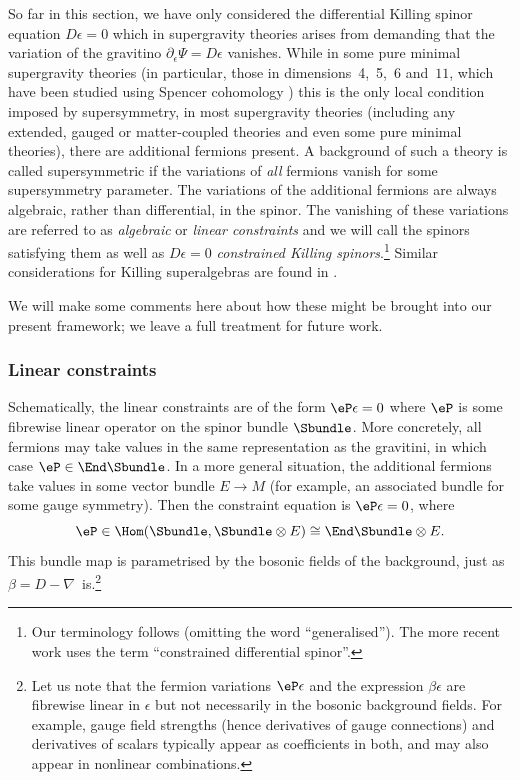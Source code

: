 So far in this section, we have only considered the differential Killing spinor equation ${D\epsilon=0}$ which in supergravity theories arises from demanding that the variation of the gravitino ${\partial_\epsilon\Psi=\!D\epsilon}$ vanishes. While in some pure minimal supergravity theories (in particular, those in dimensions~4,~5,~6 and~$11$, which have been studied using Spencer cohomology \cite{Beckett2021,deMedeiros2016,deMedeiros2018,Figueroa-OFarrill2016,Figueroa-OFarrill2017}) this is the only local condition imposed by supersymmetry, in most supergravity theories (including any extended, gauged or matter-coupled theories and even some pure minimal theories), there are additional fermions present. A background of such a theory is called supersymmetric if the variations of \emph{all} fermions vanish for some supersymmetry parameter. The variations of the additional fermions are always algebraic, rather than differential, in the spinor. The vanishing of these variations are referred to as \emph{algebraic} or \emph{linear constraints} and we will call the spinors satisfying them as well as $D\epsilon=0$ \emph{constrained Killing spinors}.\footnote{Our terminology follows \cite{Cortes2021,Lazaroiu2016} (omitting the word ``generalised''). The more recent work \cite{Shahbazi2024_1} uses the term ``constrained differential spinor''.}
Similar considerations for Killing superalgebras are found in \cite{Hustler2016}.

We will make some comments here about how these might be brought into our present framework; we leave a full treatment for future work.

\subsubsection{Linear constraints}

Schematically, the linear constraints are of the form $\eP\epsilon=0$ where $\eP$ is some fibrewise linear operator on the spinor bundle $\Sbundle$. More concretely, all fermions may take values in the same representation as the gravitini, in which case $\eP\in\End\Sbundle$. In a more general situation, the additional fermions take values in some vector bundle $E\to M$ (for example, an associated bundle for some gauge symmetry). Then the constraint equation is $\eP\epsilon=0$, where
\[
\eP\in\Hom(\Sbundle,\Sbundle\otimes E)\cong \End\Sbundle\otimes E.
\]
This bundle map is parametrised by the bosonic fields of the background, just as~${\beta=D-\nabla}$~is.\footnote{Let us note that the fermion variations $\eP\epsilon$ and the expression $\beta\epsilon$ are fibrewise linear in $\epsilon$ but not necessarily in the bosonic background fields. For example, gauge field strengths (hence derivatives of gauge connections) and derivatives of scalars typically appear as coefficients in both, and may also appear in nonlinear combinations.}

